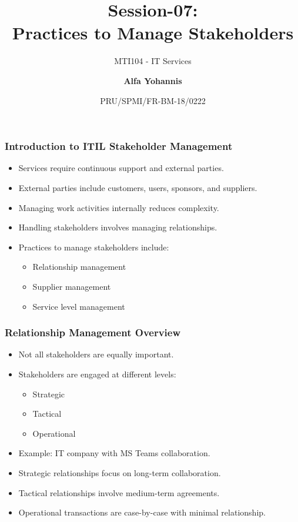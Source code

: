 \documentclass[aspectratio=169, table]{beamer}
\subtitle{MTI104 - IT Services}
\title{Session-07:\\\LARGE{Practices to Manage Stakeholders\\}}
\date[Serial]{\scriptsize {PRU/SPMI/FR-BM-18/0222}}
\author[Pradita]{\small{\textbf{Alfa Yohannis}}}
\begin{document}
\frame{\titlepage}

\begin{frame}
	\frametitle{Introduction to ITIL Stakeholder Management}
	
	\begin{itemize}
		\item Services require continuous support and external parties.
		\item External parties include customers, users, sponsors, and suppliers.
		\item Managing work activities internally reduces complexity.
		\item Handling stakeholders involves managing relationships.
		\item Practices to manage stakeholders include:
		\begin{itemize}
			\item Relationship management
			\item Supplier management
			\item Service level management
		\end{itemize}
	\end{itemize}
	
\end{frame}

\begin{frame}
	\frametitle{Relationship Management Overview}
	
	\begin{itemize}
		\item Not all stakeholders are equally important.
		\item Stakeholders are engaged at different levels:
		\begin{itemize}
			\item Strategic
			\item Tactical
			\item Operational
		\end{itemize}
		\item Example: IT company with MS Teams collaboration.
		\item Strategic relationships focus on long-term collaboration.
		\item Tactical relationships involve medium-term agreements.
		\item Operational transactions are case-by-case with minimal relationship.
	\end{itemize}
	
\end{frame}
\end{document}
